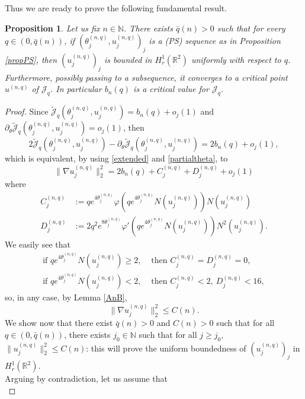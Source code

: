 \documentclass[11pt,leqno,twoside,reqno]{amsart}
\numberwithin{equation}{section}
\newtheorem{proposition}[theorem]{Proposition}
\begin{document}
Thus we are ready to prove the following fundamental result.
\begin{proposition}
\label{stime}
Let us fix $n\in \mathbb N$. There exists $\bar q(n)>0$ such that for every $q\in(0,\bar q(n))$, if $(\theta_{j}^{(n,q)}, u^{(n,q)}_{j})_{j}$ is a 
(PS) sequence as in Proposition \ref{propPS}, then $(u^{(n,q)}_{j})_{j}$ is bounded in $H^1_r(\mathbb{R}^2)$ uniformly with respect to $q$.
Furthermore, possibly passing to a subsequence, it converges to a critical point $u^{(n,q)}$ of  $\mathcal J_{q}$.
In particular $b_{n}(q)$ is  a critical value for $\mathcal J_{q}$.
\end{proposition}

\begin{proof}
Since $\tilde {\mathcal J}_{q}(\theta_{j}^{(n,q)},u^{(n,q)}_{j})=b_{n}(q) + o_j(1)$ and $\partial_{\theta}\tilde {\mathcal J}_{q}(\theta_{j}^{(n,q)}, 
u^{(n,q)}_{j})=o_j(1)$, then 
\[
2\tilde {\mathcal J}_{q}(\theta^{(n,q)}_{j},u^{(n,q)}_{j})
-\partial_{\theta} \tilde {\mathcal J}_{q}(\theta^{(n,q)}_{j}, u^{(n,q)}_{j})=2b_{n}(q)+o_j(1),
\]
which is equivalent, by using \eqref{extended} and \eqref{partialtheta}, to
\[
\|\nabla u_{j}^{(n,q)}\|_{2}^{2}=2b_{n}(q)+C_{j}^{(n,q)}+D_{j}^{(n,q)}+o_j(1)
\]
where
\begin{align*}
C_{j}^{(n,q)}
&:=
qe^{4\theta_{j}^{(n,q)}}\varphi(qe^{4\theta_{j}^{(n,q)}}N(u_{j}^{(n,q)}))N(u_{j}^{(n,q)})\\
D_{j}^{(n,q)}
&:=
2q^2e^{8\theta_{j}^{(n,q)}} \varphi'(qe^{4\theta_{j}^{(n,q)}}N(u^{(n,q)}_{j})) N^{2}(u_{j}^{(n,q)}).
\end{align*}
We easily see that
\begin{align*}
\text{if } qe^{4\theta^{(n,q)}_{j}} N(u_{j}^{(n,q)}){\geqslant} 2,
& \text{ then }   C_{j}^{(n,q)}=D_{j}^{(n,q)}=0, \\
\text{if } qe^{4\theta^{(n,q)}_{j}} N(u_{j}^{(n,q)})< 2, 
& \text{ then } C_{j}^{(n,q)}< 2,\ D_{j}^{(n,q)}< 16,
\end{align*}
so, in any case, by Lemma \ref{AnB}, 
\[ 
\|\nabla u^{(n,q)}_j\|_2^2{\leqslant} C(n). 
\]
We show now that there exist $\bar q(n)>0$ and $C(n)>0$ such that for all $q\in (0,\bar q(n))$, there exists $j_0\in {\mathbb{N}}$ such that for all  $j{\geqslant} j_0$, $\|u^{(n,q)}_{j}\|^{2}_{2}{\leqslant} C(n)$: this will prove the uniform boundedness of $(u_j^{(n,q)})_j$ in ${H^1_r({{\mathbb{R}^2}})}$.
\\
Arguing by contradiction, let us assume that
\begin{equation}\label{assurdo}

\end{equation}
\end{proof}
\end{document}
